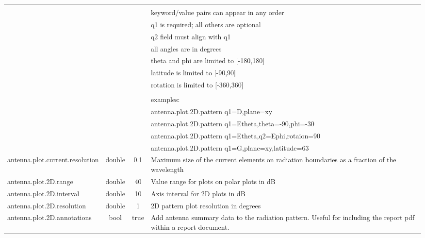 \documentclass[titlepage]{article}
\renewcommand\_{\textunderscore\linebreak[1]}
\begin{document}
\begin{longtable}[c]{|lccp{8cm}|}
                                  &        &        &    \\
                                  &        &        &    keyword/value pairs can appear in any order\\
                                  &        &        &    q1 is required; all others are optional\\
                                  &        &        &    q2 field must align with q1\\
                                  &        &        &    all angles are in degrees\\
                                  &        &        &    theta and phi are limited to [-180,180]\\
                                  &        &        &    latitude is limited to [-90,90]\\
                                  &        &        &    rotation is limited to [-360,360]\\
                                  &        &        &    \\
                                  &        &        &    examples: \\
                                  &        &        &       antenna.plot.2D.pattern   q1=D,plane=xy \\
                                  &        &        &       antenna.plot.2D.pattern   q1=Etheta,theta=-90,phi=-30 \\
                                  &        &        &       antenna.plot.2D.pattern   q1=Etheta,q2=Ephi,rotaion=90 \\
                                  &        &        &       antenna.plot.2D.pattern   q1=G,plane=xy,latitude=63 \\
    antenna.plot.current.resolution & double & 0.1  & Maximum size of the current elements on radiation boundaries as a fraction of the wavelength \\
    antenna.plot.2D.range         & double & 40     & Value range for plots on polar plots in dB \\
    antenna.plot.2D.interval      & double & 10     & Axis interval for 2D plots in dB \\
    antenna.plot.2D.resolution    & double & 1      & 2D pattern plot resolution in degrees \\
    antenna.plot.2D.annotations   & bool   & true   & Add antenna summary data to the radiation pattern.  Useful for including the report pdf within a report document. \\

\end{longtable}
\end{document}
